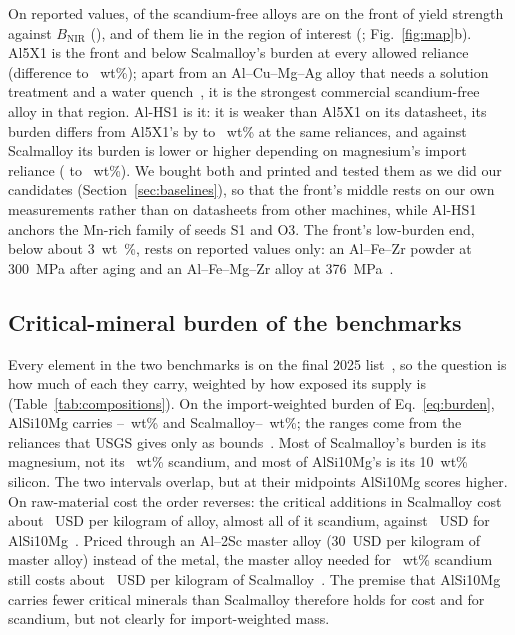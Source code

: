 \documentclass[preprint,12pt]{elsarticle}
\newcommand{\note}[1]{}
\newcommand{\note}[1]{\textcolor{blue!70!black}{\textsf{\footnotesize [Note: #1]}}}
\newcommand{\Scal}{Scalmalloy\xspace}
\newcommand{\AlSi}{AlSi10Mg\xspace}
\begin{document}
On reported values, \NFront{} of the scandium-free alloys are on the front of yield strength against $B_\mathrm{NIR}$ (\FrontList), and \NFrontRegion{} of them lie in the region of interest (\FrontRegionList; Fig.~\ref{fig:map}b).
Al5X1 is \AlfiveOnFront{} the front and below \Scal's burden at every allowed reliance (difference \PAlfivelo{} to \PAlfivehi~wt\%); apart from an Al--Cu--Mg--Ag alloy that needs a solution treatment and a water quench~\cite{ds_al2139}, it is the strongest commercial scandium-free alloy in that region.
Al-HS1 is \AlhsOnFront{} it: it is weaker than Al5X1 on its datasheet, its burden differs from Al5X1's by \PHSvsfivelo{} to \PHSvsfivehi~wt\% at the same reliances, and against \Scal its burden is lower or higher depending on magnesium's import reliance (\PAlhslo{} to \PAlhshi~wt\%).
We bought both and printed and tested them as we did our candidates (Section~\ref{sec:baselines}), so that the front's middle rests on our own measurements rather than on datasheets from other machines, while Al-HS1 anchors the Mn-rich family of seeds S1 and O3.
The front's low-burden end, below about \SI{3}{wt\%}, rests on reported values only: an Al--Fe--Zr powder at \SI{300}{MPa} after aging and an Al--Fe--Mg--Zr alloy at \SI{376}{MPa}~\cite{ds_cp1,alfezr2025}.
\note{A third purchase (Aheadd CP1, EOS article 9030-0034) would anchor the low-burden end in-house; decide after the screen (../baselines.md).}

\subsection{Critical-mineral burden of the benchmarks}

Every element in the two benchmarks is on the final 2025 list~\cite{fr2025}, so the question is how much of each they carry, weighted by how exposed its supply is (Table~\ref{tab:compositions}).
On the import-weighted burden of Eq.~\ref{eq:burden}, \AlSi carries \BAlSinirlo--\BAlSinirhi~wt\% and \Scal \BScalnirlo--\BScalnirhi~wt\%; the ranges come from the reliances that USGS gives only as bounds~\cite{usgs2026}.
Most of \Scal's burden is its magnesium, not its \ScalSc~wt\% scandium, and most of \AlSi's is its 10~wt\% silicon. The two intervals overlap, but at their midpoints \AlSi scores higher.
On raw-material cost the order reverses: the critical additions in \Scal cost about \BScalcost~USD per kilogram of alloy, almost all of it scandium, against \BAlSicost~USD for \AlSi~\cite{usgs2026}. Priced through an Al--2Sc master alloy (30~USD per kilogram of master alloy) instead of the metal, the master alloy needed for \ScalSc~wt\% scandium still costs about \ScalMasterCost~USD per kilogram of \Scal~\cite{usgs2026sc}.
The premise that \AlSi carries fewer critical minerals than \Scal therefore holds for cost and for scandium, but not clearly for import-weighted mass.
\end{document}
